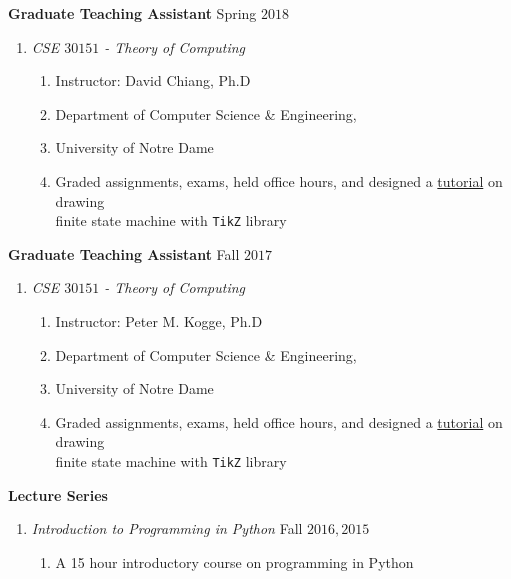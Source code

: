 \documentclass[11pt]{article}
\newenvironment{innerlist}[1][\enskip]%
        {\begin{enumerate}[#1,leftmargin=*,parsep=0pt,itemsep=0pt,topsep=0pt,partopsep=0pt]}
        {\end{enumerate}}
\newcommand{\halfblankline}{\quad\vspace{-0.5\baselineskip}\pagebreak[3]}
\begin{document}
\textbf{Graduate Teaching Assistant} \hfill {Spring $2018$}
\begin{innerlist}
\item[] \emph{CSE $30151$ - Theory of Computing}
    \begin{innerlist}
        \item[] Instructor: David Chiang, Ph.D
        
        \item[] Department of Computer Science \& Engineering,
        
        \item[] University of Notre Dame
        
        \item[] Graded assignments, exams, held office hours, and designed a \href{https://www3.nd.edu/~dchiang/teaching/theory/2018/www/tikz_tutorial.pdf}{tutorial} on drawing \\ finite state machine with \texttt{TikZ} library
    \end{innerlist}
\end{innerlist}

\halfblankline

\textbf{Graduate Teaching Assistant} \hfill {Fall $2017$}
\begin{innerlist}
\item[] \emph{CSE $30151$ - Theory of Computing}
    \begin{innerlist}
        \item[] Instructor: Peter M. Kogge, Ph.D
        
        \item[] Department of Computer Science \& Engineering,
        
        \item[] University of Notre Dame
        
        \item[] Graded assignments, exams, held office hours, and designed a \href{https://www3.nd.edu/~kogge/courses/cse30151-fa17/Public/other/tikz_tutorial.pdf}{tutorial} on drawing \\ finite state machine with \texttt{TikZ} library
    \end{innerlist}
\end{innerlist}

\halfblankline
\newpage
\textbf{Lecture Series}

\begin{innerlist}
	\item[] \emph{Introduction to Programming in Python} \hfill Fall $2016, 2015$
	\begin{innerlist}
	    \item[] A 15 hour introductory course on programming in Python
	\end{innerlist}
\end{innerlist}
\end{document}
